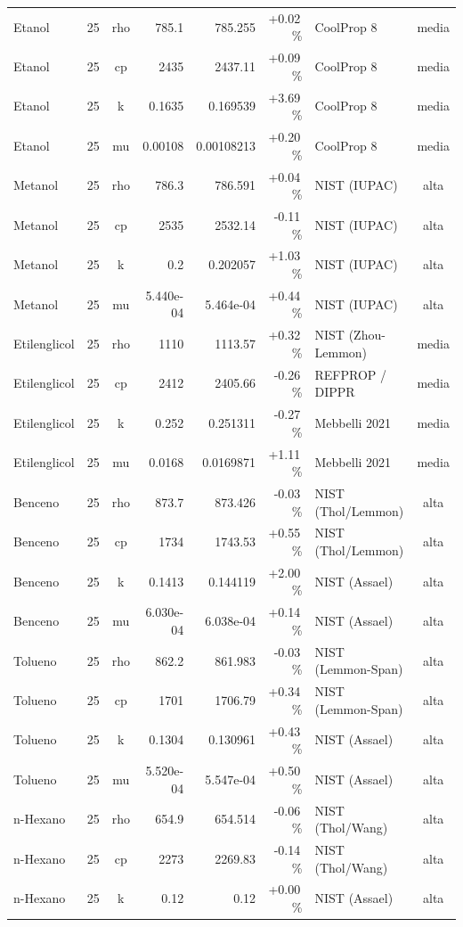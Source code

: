 \documentclass[11pt,a4paper]{article}
\begin{document}
{\begin{longtable}{@{}l c c r r r l c@{}}
Etanol & 25 & rho & 785.1 & 785.255 & +0.02\,\% & CoolProp 8 & media \\
Etanol & 25 & cp & 2435 & 2437.11 & +0.09\,\% & CoolProp 8 & media \\
Etanol & 25 & k & 0.1635 & 0.169539 & +3.69\,\% & CoolProp 8 & media \\
Etanol & 25 & mu & 0.00108 & 0.00108213 & +0.20\,\% & CoolProp 8 & media \\
Metanol & 25 & rho & 786.3 & 786.591 & +0.04\,\% & NIST (IUPAC) & alta \\
Metanol & 25 & cp & 2535 & 2532.14 & -0.11\,\% & NIST (IUPAC) & alta \\
Metanol & 25 & k & 0.2 & 0.202057 & +1.03\,\% & NIST (IUPAC) & alta \\
Metanol & 25 & mu & 5.440e-04 & 5.464e-04 & +0.44\,\% & NIST (IUPAC) & alta \\
Etilenglicol & 25 & rho & 1110 & 1113.57 & +0.32\,\% & NIST (Zhou-Lemmon) & media \\
Etilenglicol & 25 & cp & 2412 & 2405.66 & -0.26\,\% & REFPROP / DIPPR & media \\
Etilenglicol & 25 & k & 0.252 & 0.251311 & -0.27\,\% & Mebbelli 2021 & media \\
Etilenglicol & 25 & mu & 0.0168 & 0.0169871 & +1.11\,\% & Mebbelli 2021 & media \\
Benceno & 25 & rho & 873.7 & 873.426 & -0.03\,\% & NIST (Thol/Lemmon) & alta \\
Benceno & 25 & cp & 1734 & 1743.53 & +0.55\,\% & NIST (Thol/Lemmon) & alta \\
Benceno & 25 & k & 0.1413 & 0.144119 & +2.00\,\% & NIST (Assael) & alta \\
Benceno & 25 & mu & 6.030e-04 & 6.038e-04 & +0.14\,\% & NIST (Assael) & alta \\
Tolueno & 25 & rho & 862.2 & 861.983 & -0.03\,\% & NIST (Lemmon-Span) & alta \\
Tolueno & 25 & cp & 1701 & 1706.79 & +0.34\,\% & NIST (Lemmon-Span) & alta \\
Tolueno & 25 & k & 0.1304 & 0.130961 & +0.43\,\% & NIST (Assael) & alta \\
Tolueno & 25 & mu & 5.520e-04 & 5.547e-04 & +0.50\,\% & NIST (Assael) & alta \\
n-Hexano & 25 & rho & 654.9 & 654.514 & -0.06\,\% & NIST (Thol/Wang) & alta \\
n-Hexano & 25 & cp & 2273 & 2269.83 & -0.14\,\% & NIST (Thol/Wang) & alta \\
n-Hexano & 25 & k & 0.12 & 0.12 & +0.00\,\% & NIST (Assael) & alta \\

\end{longtable}}
\end{document}
